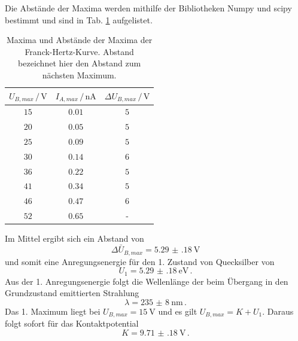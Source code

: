 \FloatBarrier
Die Abstände der Maxima werden mithilfe der Bibliotheken Numpy\cite{numpy} und scipy\cite{scipy} bestimmt und sind in Tab. \ref{tab:abstand} aufgelistet.
\begin{table}
    \centering
    \begin{tabular}{ccc}
        \toprule
        $U_{B,max} \,/\, \si{\volt}$ & $I_{A,max} \,/\, \si{\nano\ampere}$ & $\Delta U_{B,max} \,/\, \si{\volt} $ \\
        \midrule
        $15$ & $0.01$ & $5$ \\
        $20$ & $0.05$ & $5$ \\
        $25$ & $0.09$ & $5$ \\
        $30$ & $0.14$ & $6$ \\
        $36$ & $0.22$ & $5$ \\
        $41$ & $0.34$ & $5$ \\
        $46$ & $0.47$ & $6$ \\
        $52$ & $0.65$ & - \\
        \bottomrule
    \end{tabular}
    \caption{Maxima und Abstände der Maxima der Franck-Hertz-Kurve. Abstand bezeichnet hier den Abstand zum nächsten Maximum.}
    \label{tab:abstand}
\end{table}
Im Mittel ergibt sich ein Abstand von
\begin{equation*}
    \Delta \bar{U}_{B,max} = \SI{5.29(18)}{\volt}
\end{equation*}
und somit eine Anregungsenergie für den 1. Zustand von Quecksilber von
\begin{equation}
    U_1 = \SI{5.29(18)}{\electronvolt} \, .
\end{equation}
Aus der 1. Anregungsenergie folgt die Wellenlänge der beim Übergang in den Grundzustand emittierten Strahlung %
\begin{equation}
    \lambda = \SI{235(8)}{\nano\metre} \, .
\end{equation}
Das 1. Maximum liegt bei $U_{B,max}=\SI{15}{\volt}$ und es gilt $U_{B,max} = K + U_1$.
Daraus folgt sofort für das Kontaktpotential
\begin{equation}
    K = \SI{9.71(18)}{\volt} \, .
\end{equation}
